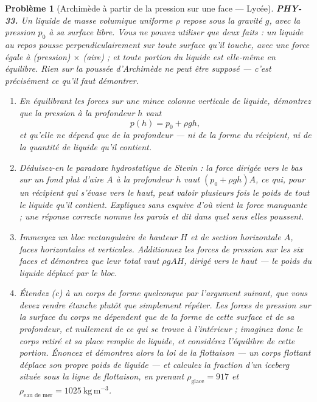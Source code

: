 \documentclass[11pt]{article}
\newtheorem{problem}{Problème}
\begin{document}
\begin{problem}[{Archimède à partir de la pression sur une face --- Lycée}]
\textbf{PHY-33.} Un liquide de masse volumique uniforme $ \rho $ repose sous la gravité
$ g $, avec la pression $ p_{0} $ à sa surface libre. Vous ne pouvez utiliser que deux
faits : un liquide au repos pousse perpendiculairement sur toute surface qu'il touche, avec une
force égale à (pression) $\times$ (aire) ; et toute portion du liquide est elle-même en équilibre. Rien
sur la poussée d'Archimède ne peut être supposé --- c'est précisément ce qu'il faut démontrer.
\begin{enumerate}
\item[(a)] En équilibrant les forces sur une mince colonne verticale de liquide, démontrez que la
pression à la profondeur $ h $ vaut
\[ p(h) = p_{0} + \rho g h, \]
et qu'elle ne dépend que de la profondeur --- ni de la forme du récipient, ni de la quantité de
liquide qu'il contient.
\item[(b)] Déduisez-en le paradoxe hydrostatique de Stevin : la force dirigée vers le bas sur un fond
plat d'aire $ A $ à la profondeur $ h $ vaut $ (p_{0} + \rho g h)A $, ce qui, pour un
récipient qui s'évase vers le haut, peut valoir plusieurs fois le poids de tout le liquide qu'il
contient. Expliquez sans esquive d'où vient la force manquante ; une réponse correcte nomme les
parois et dit dans quel sens elles poussent.
\item[(c)] Immergez un bloc rectangulaire de hauteur $ H $ et de section horizontale $ A $, faces
horizontales et verticales. Additionnez les forces de pression sur les six faces et démontrez
que leur total vaut $ \rho g A H $, dirigé vers le haut --- le poids du liquide déplacé par le
bloc.
\item[(d)] Étendez (c) à un corps de forme quelconque par l'argument suivant, que vous devez rendre
étanche plutôt que simplement répéter. Les forces de pression sur la surface du corps ne
dépendent que de la forme de cette surface et de sa profondeur, et nullement de ce qui se trouve
à l'intérieur ; imaginez donc le corps retiré et sa place remplie de liquide, et considérez
l'équilibre de cette portion. Énoncez et démontrez alors la loi de la flottaison --- un corps
flottant déplace son propre poids de liquide --- et calculez la fraction d'un iceberg située sous
la ligne de flottaison, en prenant $ \rho_{\text{glace}} = 917 $ et
$ \rho_{\text{eau de mer}} = 1025\ \mathrm{kg\,m^{-3}} $.
\end{enumerate}

\end{problem}
\end{document}
